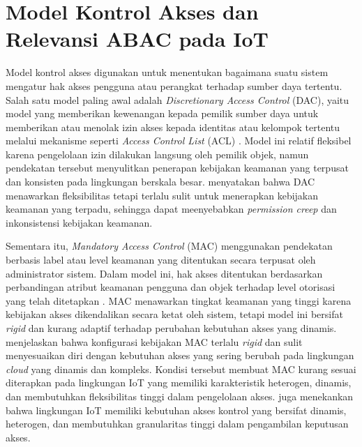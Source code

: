 \section{Model Kontrol Akses dan Relevansi ABAC pada IoT}

Model kontrol akses digunakan untuk menentukan bagaimana suatu sistem mengatur hak akses pengguna atau perangkat terhadap sumber daya tertentu. Salah satu model paling awal adalah \textit{Discretionary Access Control} (DAC), yaitu model yang memberikan kewenangan kepada pemilik sumber daya untuk memberikan atau menolak izin akses kepada identitas atau kelompok tertentu melalui mekanisme seperti \textit{Access Control List} (ACL) \parencite{diaz_authorization_2025}. Model ini relatif fleksibel karena pengelolaan izin dilakukan langsung oleh pemilik objek, namun pendekatan tersebut menyulitkan penerapan kebijakan keamanan yang terpusat dan konsisten pada lingkungan berskala besar. \textcite{mao_zero-trust_2025} menyatakan bahwa DAC menawarkan fleksibilitas tetapi terlalu sulit untuk menerapkan kebijakan keamanan yang terpadu, sehingga dapat meenyebabkan \textit{permission creep} dan inkonsistensi kebijakan keamanan.

Sementara itu, \textit{Mandatory Access Control} (MAC) menggunakan pendekatan berbasis label atau level keamanan yang ditentukan secara terpusat oleh administrator sistem. Dalam model ini, hak akses ditentukan berdasarkan perbandingan atribut keamanan pengguna dan objek terhadap level otorisasi yang telah ditetapkan \parencite{diaz_authorization_2025}. MAC menawarkan tingkat keamanan yang tinggi karena kebijakan akses dikendalikan secara ketat oleh sistem, tetapi model ini bersifat \textit{rigid} dan kurang adaptif terhadap perubahan kebutuhan akses yang dinamis. \textcite{mao_zero-trust_2025} menjelaskan bahwa konfigurasi kebijakan MAC terlalu \textit{rigid} dan sulit menyesuaikan diri dengan kebutuhan akses yang sering berubah pada lingkungan \textit{cloud} yang dinamis dan kompleks. Kondisi tersebut membuat MAC kurang sesuai diterapkan pada lingkungan IoT yang memiliki karakteristik heterogen, dinamis, dan membutuhkan fleksibilitas tinggi dalam pengelolaan akses. \textcite{ragothaman_access_2023} juga menekankan bahwa lingkungan IoT memiliki kebutuhan akses kontrol yang bersifat dinamis, heterogen, dan membutuhkan granularitas tinggi dalam pengambilan keputusan akses.

